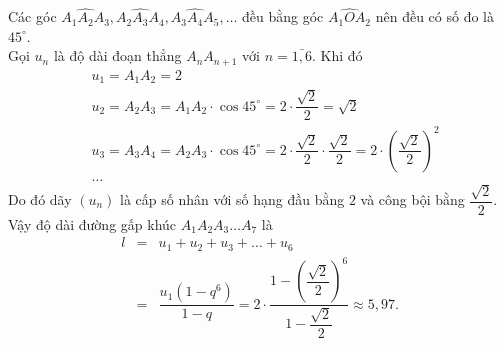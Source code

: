 \begin{ex}
{\begin{center}
		\end{center}
		Các góc $\widehat{A_1A_2A_3}, \widehat{A_2A_3A_4}, \widehat{A_3A_4A_5}, \ldots$ đều bằng góc $\widehat{A_1OA_2}$ nên đều có số đo là $45^{\circ}$.\\
		Gọi $u_n$ là độ dài đoạn thẳng $A_nA_{n+1}$ với $n=\bar{1,6}$. Khi đó
		$$
			\begin{aligned}
				& u_1=A_1A_2=2\\
				 &u_2= A_2 A_3=A_1 A_2 \cdot \cos 45^{\circ}=2 \cdot \dfrac{\sqrt{2}}{2}=\sqrt{2}                                                                                  \\
				 &u_3= A_3 A_4=A_2 A_3 \cdot \cos 45^{\circ}=2 \cdot \dfrac{\sqrt{2}}{2} \cdot \dfrac{\sqrt{2}}{2}=2\cdot\left(\dfrac{\sqrt{2}}{2}\right)^2                        \\
				 & \ldots
			\end{aligned}
		$$
		Do đó dãy $(u_n)$ là cấp số nhân với số hạng đầu bằng $2$ và công bội bằng $\dfrac{\sqrt{2}}{2}$.\\
		Vậy độ dài đường gấp khúc $A_1A_2A_3\ldots A_7$ là 
		\begin{eqnarray*}
			l&=&u_1+u_2+u_3+\ldots+u_6\\
			 &=&\dfrac{u_1(1-q^6)}{1-q}=2\cdot\dfrac{1-\left(\dfrac{\sqrt{2}}{2}\right)^6}{1-\dfrac{\sqrt{2}}{2}}\approx 5{,}97.
		\end{eqnarray*}
	}
\end{ex}

